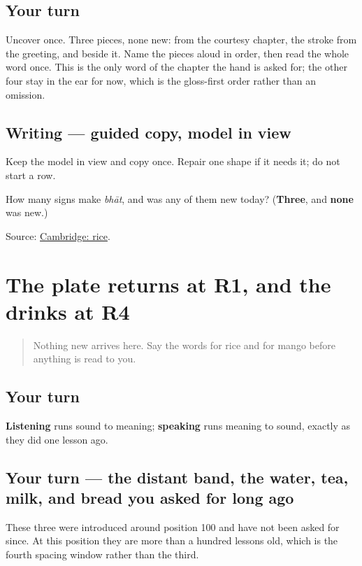\subsection*{Your turn}
Uncover \textbf{} once. Three pieces, none new: \textbf{} from the courtesy chapter, the \textbf{} stroke from the greeting, and \textbf{} beside it. Name the pieces aloud in order, then read the whole word once. This is the only word of the chapter the hand is asked for; the other four stay in the ear for now, which is the gloss-first order rather than an omission.

\subsection*{Writing — guided copy, model in view}
Keep the model in view and copy \textbf{} once. Repair one shape if it needs it; do not start a row.

\begin{tcolorbox}[breakable,colback=teal!4,colframe=teal!35!black,title={Before you move on}]
How many signs make \emph{bhāt}, and was any of them new today? (\textbf{Three}, and \textbf{none} was new.)

Source: \href{https://dictionary.cambridge.org/dictionary/english-gujarati/rice}{Cambridge: rice}.
\end{tcolorbox}
\section[Practice]{The plate returns at R1, and the drinks at R4}

\label{lesson:GU-R27-plate-five-r1}



\begin{quote}
Nothing new arrives here. Say the words for rice and for mango before anything is read to you.
\end{quote}

\subsection*{Your turn}
\textbf{Listening} runs sound to meaning; \textbf{speaking} runs meaning to sound, exactly as they did one lesson ago.

\subsection*{Your turn — the distant band, the water, tea, milk, and bread you asked for long ago}
These three were introduced around position 100 and have not been asked for since. At this position they are more than a hundred lessons old, which is the fourth spacing window rather than the third.

